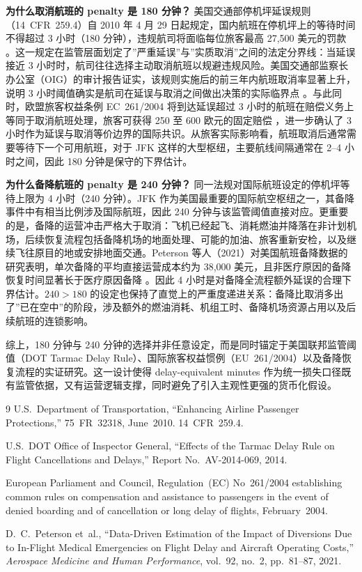 \documentclass[UTF8,fontset=fandol,11pt]{ctexart}
\begin{document}
\textbf{为什么取消航班的 penalty 是 180 分钟？}
美国交通部停机坪延误规则（14~CFR~259.4）自 2010 年 4 月 29 日起规定，国内航班在停机坪上的等待时间不得超过 3 小时（180 分钟），违规航司将面临每位旅客最高 27,500 美元的罚款 \cite{dot2010tarmac}。这一规定在监管层面划定了”严重延误”与”实质取消”之间的法定分界线：当延误接近 3 小时时，航司往往选择主动取消航班以规避违规风险。美国交通部监察长办公室（OIG）的审计报告证实，该规则实施后的前三年内航班取消率显著上升，说明 3 小时阈值确实是航司在延误与取消之间做出决策的实际临界点 \cite{dotoig2014tdr}。与此同时，欧盟旅客权益条例 EC~261/2004 将到达延误超过 3 小时的航班在赔偿义务上等同于取消航班处理，旅客可获得 250 至 600 欧元的固定赔偿 \cite{eu261}，进一步确认了 3 小时作为延误与取消等价边界的国际共识。从旅客实际影响看，航班取消后通常需要等待下一个可用航班，对于 JFK 这样的大型枢纽，主要航线间隔通常在 2--4 小时之间，因此 180 分钟是保守的下界估计。

\textbf{为什么备降航班的 penalty 是 240 分钟？}
同一法规对国际航班设定的停机坪等待上限为 4 小时（240 分钟）\cite{dot2010tarmac}。JFK 作为美国最重要的国际航空枢纽之一，其备降事件中有相当比例涉及国际航班，因此 240 分钟与该监管阈值直接对应。更重要的是，备降的运营冲击严格大于取消：飞机已经起飞、消耗燃油并降落在非计划机场，后续恢复流程包括备降机场的地面处理、可能的加油、旅客重新安检，以及继续飞往原目的地或安排地面交通。Peterson 等人（2021）对美国航班备降数据的研究表明，单次备降的平均直接运营成本约为 38,000 美元，且非医疗原因的备降恢复时间显著长于医疗原因备降 \cite{peterson2021diversion}。因此 4 小时是对备降全流程额外延误的合理下界估计。$240 > 180$ 的设定也保持了直觉上的严重度递进关系：备降比取消多出了”已在空中”的阶段，涉及额外的燃油消耗、机组工时、备降机场资源占用以及后续航班的连锁影响。

综上，180 分钟与 240 分钟的选择并非任意设定，而是同时锚定于美国联邦监管阈值（DOT Tarmac Delay Rule）、国际旅客权益惯例（EU~261/2004）以及备降恢复流程的实证研究。这一设计使得 delay-equivalent minutes 作为统一损失口径既有监管依据，又有运营逻辑支撑，同时避免了引入主观性更强的货币化假设。

\begin{thebibliography}{9}
U.S.\ Department of Transportation, ``Enhancing Airline Passenger Protections,'' 75~FR~32318, June~2010. 14~CFR~259.4.

U.S.\ DOT Office of Inspector General, ``Effects of the Tarmac Delay Rule on Flight Cancellations and Delays,'' Report No.\ AV-2014-069, 2014.

European Parliament and Council, Regulation~(EC) No~261/2004 establishing common rules on compensation and assistance to passengers in the event of denied boarding and of cancellation or long delay of flights, February~2004.

D.~C.~Peterson et~al., ``Data-Driven Estimation of the Impact of Diversions Due to In-Flight Medical Emergencies on Flight Delay and Aircraft Operating Costs,'' \emph{Aerospace Medicine and Human Performance}, vol.~92, no.~2, pp.~81--87, 2021.
\end{thebibliography}
\end{document}
